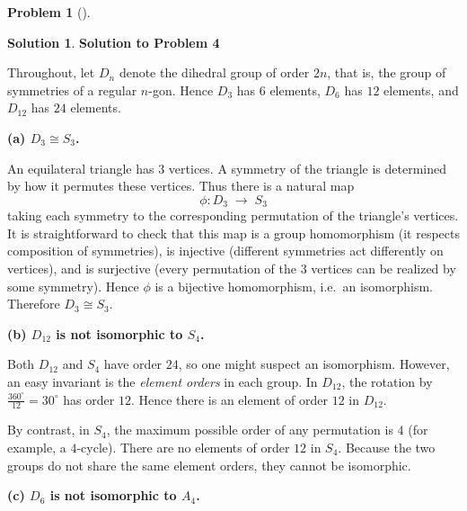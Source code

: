 \documentclass[12pt]{article}
\theoremstyle{definition} %
\newtheorem{solution}{Solution}
\newtheorem{problem}{Problem}
\theoremstyle{plain} %
\begin{document}
\begin{problem}[]
    
\end{problem}
\begin{solution}
    \textbf{Solution to Problem 4}

    \bigskip
    
    Throughout, let $D_n$ denote the dihedral group of order $2n$, that is, the group of symmetries
    of a regular $n$-gon.  Hence $D_3$ has $6$ elements, $D_6$ has $12$ elements, and $D_{12}$ has $24$ elements.
    
    \bigskip
    
    \noindent
    \textbf{(a) $D_3 \cong S_3$.}
    
    \medskip
    
    \noindent
    An equilateral triangle has $3$ vertices.  A symmetry of the triangle is determined by how it permutes
    these vertices.  Thus there is a natural map
    \[
    \phi: D_3 \;\longrightarrow\; S_3
    \]
    taking each symmetry to the corresponding permutation of the triangle's vertices.
    It is straightforward to check that this map is a group homomorphism (it respects composition of symmetries),
    is injective (different symmetries act differently on vertices),
    and is surjective (every permutation of the $3$ vertices can be realized by some symmetry).
    Hence $\phi$ is a bijective homomorphism, i.e.\ an isomorphism.  Therefore $D_3 \cong S_3$.
    
    \bigskip
    
    \noindent
    \textbf{(b) $D_{12}$ is not isomorphic to $S_4$.}
    
    \medskip
    
    \noindent
    Both $D_{12}$ and $S_4$ have order $24$, so one might suspect an isomorphism.  However, an easy invariant
    is the \emph{element orders} in each group.  In $D_{12}$, the rotation by $\tfrac{360^\circ}{12} = 30^\circ$
    has order $12$.  Hence there is an element of order $12$ in $D_{12}$.
    
    By contrast, in $S_4$, the maximum possible order of any permutation is $4$ (for example, a $4$-cycle).
    There are no elements of order $12$ in $S_4$.  Because the two groups do not share the same element orders,
    they cannot be isomorphic.
    
    \bigskip
    
    \noindent
    \textbf{(c) $D_{6}$ is not isomorphic to $A_4$.}
    
    \medskip
    

\end{solution}
\end{document}
